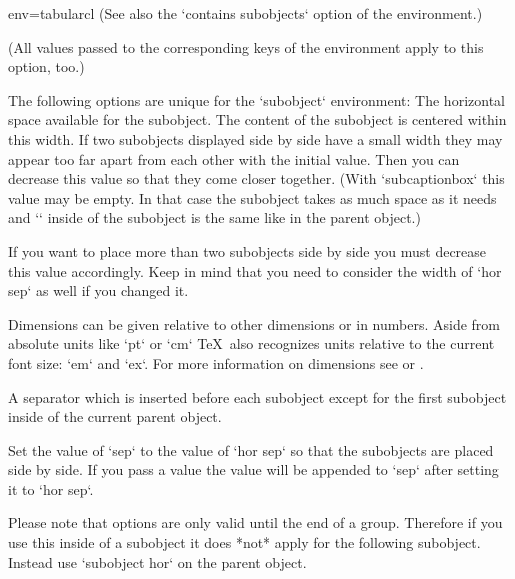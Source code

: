 \begin{tableobject}{env=tabular}{cl}
  (See also the `contains subobjects` option of the  environment.)

  (All values passed to the corresponding keys of the  environment apply to this option, too.)





\endkeydoc

The following options are unique for the `subobject` environment:
  The horizontal space available for the subobject.
  The content of the subobject is centered within this width.
  If two subobjects displayed side by side have a small width they may appear too far apart from each other with the initial value.
  Then you can decrease this value so that they come closer together.
  (With `subcaptionbox` this value may be empty.
   In that case the subobject takes as much space as it needs
   and `\linewidth` inside of the subobject is the same like in the parent object.)

  If you want to place more than two subobjects side by side you must decrease this value accordingly.
  Keep in mind that you need to consider the width of `hor sep` as well if you changed it.

  Dimensions can be given relative to other dimensions or in numbers.
  Aside from absolute units like `pt` or `cm` \TeX\ also recognizes units relative to the current font size: `em` and `ex`.
  For more information on dimensions see  or .

  A separator which is inserted before each subobject except for the first subobject inside of the current parent object.

  Set the value of `sep` to the value of `hor sep` so that the subobjects are placed side by side.
  If you pass a value the value will be appended to `sep` after setting it to `hor sep`.

  Please note that options are only valid until the end of a group.
  Therefore if you use this inside of a subobject it does *not* apply for the following subobject.
  Instead use `subobject hor` on the parent object.


\end{tableobject}
